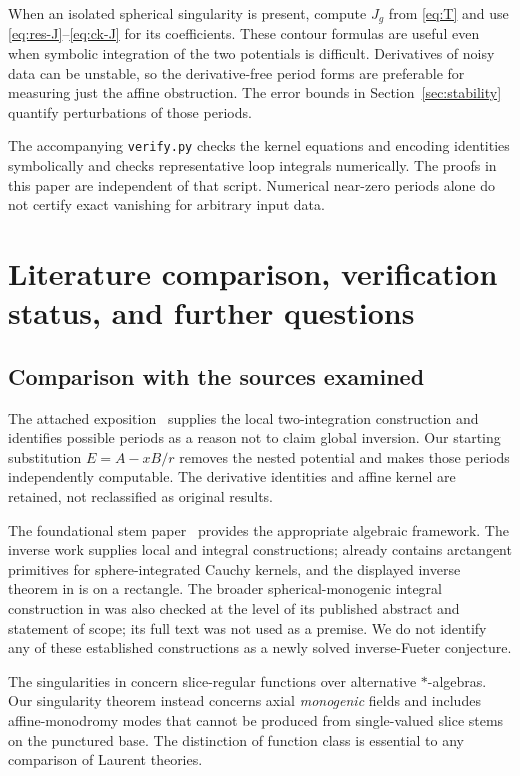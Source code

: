 \documentclass[11pt,a4paper]{article}
\numberwithin{equation}{section}
\theoremstyle{definition}
\theoremstyle{remark}
\begin{document}
When an isolated spherical singularity is present, compute $J_g$ from
\eqref{eq:T} and use \eqref{eq:res-J}--\eqref{eq:ck-J} for its
coefficients. These contour formulas are useful even when symbolic
integration of the two potentials is difficult. Derivatives of noisy
data can be unstable, so the derivative-free period forms are preferable
for measuring just the affine obstruction. The error bounds in
Section~\ref{sec:stability} quantify perturbations of those periods.

The accompanying \texttt{verify.py} checks the kernel equations and
encoding identities symbolically and checks representative loop
integrals numerically. The proofs in this paper are independent of that
script. Numerical near-zero periods alone do not certify exact
vanishing for arbitrary input data.

\section{Literature comparison, verification status, and further questions}
\label{sec:literature}

\subsection{Comparison with the sources examined}
The attached exposition~\cite{Supplied} supplies the local two-integration
construction and identifies possible periods as a reason not to claim
global inversion. Our starting substitution $E=A-xB/r$ removes the
nested potential and makes those periods independently computable.
The derivative identities and affine kernel are retained, not
reclassified as original results.

The foundational stem paper~\cite{GP} provides the appropriate algebraic
framework. The inverse work \cite{CSS,CPSS} supplies local and integral
constructions; \cite{CSS} already contains arctangent primitives for
sphere-integrated Cauchy kernels, and the displayed inverse theorem in
\cite{CPSS} is on a rectangle. The broader spherical-monogenic integral
construction in \cite{CSSSpherical} was also checked at the level of its
published abstract and statement of scope; its full text was not used
as a premise. We do not identify any of these established constructions
as a newly solved inverse-Fueter conjecture.

The singularities in \cite{GPSt} concern slice-regular functions over
alternative $*$-algebras. Our singularity theorem instead concerns axial
\emph{monogenic} fields and includes affine-monodromy modes that cannot
be produced from single-valued slice stems on the punctured base.
The distinction of function class is essential to any comparison of
Laurent theories.
\end{document}
